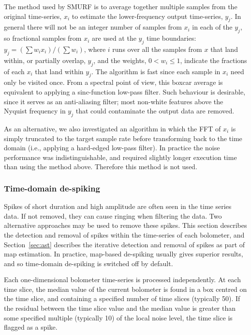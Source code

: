 \documentclass[useAMS,usenatbib,nofootinbib]{mn2e}
\begin{document}
The method used by SMURF is to average together multiple samples from
the original time-series, $x_i$ to estimate the lower-frequency output
time-series, $y_j$. In general there will not be an integer number of
samples from $x_i$ in each of the $y_j$, so fractional samples from
$x_i$ are used at the $y_j$ time boundaries: $y_j = (\sum w_i
x_i)/(\sum w_i)$, where $i$ runs over all the samples from $x$ that
land within, or partially overlap, $y_j$, and the weights,
$0<w_i\le1$, indicate the fractions of each $x_i$ that land within
$y_j$. The algorithm is fast since each sample in $x_i$ need only be
visited once. From a spectral point of view, this boxcar average is
equivalent to applying a sinc-function low-pass filter. Such behaviour
is desirable, since it serves as an anti-aliasing filter; most
non-white features above the Nyquist frequency in $y_j$ that could
contaminate the output data are removed.

As an alternative, we also investigated an algorithm in which the FFT
of $x_i$ is simply truncated to the target sample rate before
transforming back to the time domain (i.e., applying a hard-edged
low-pass filter). In practice the noise performance was
indistinguishable, and required slightly longer execution time than using
the method above. Therefore this method is not used.

\subsubsection{Time-domain de-spiking}
\label{sec:timedespike}

Spikes of short duration and high amplitude are often seen in the time
series data. If not removed, they can cause ringing when filtering the
data. Two alternative approaches may be used to remove these
spikes. This section describes the detection and removal of spikes
within the time-series of each bolometer, and Section~\ref{sec:ast}
describes the iterative detection and removal of spikes as part of map
estimation. In practice, map-based de-spiking usually gives superior
results, and so time-domain de-spiking is switched off by default.

Each one-dimensional bolometer time-series is processed
independently. At each time slice, the median value of the current
bolometer is found in a box centred on the time slice, and containing
a specified number of time slices (typically 50). If the residual
between the time slice value and the median value is greater than some
specified multiple (typically 10) of the local noise level, the time
slice is flagged as a spike.
\end{document}

